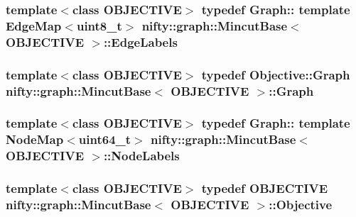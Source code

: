 \subsubsection[{Edge\+Labels}]{\setlength{\rightskip}{0pt plus 5cm}template$<$class O\+B\+J\+E\+C\+T\+I\+V\+E$>$ typedef Graph\+:: template Edge\+Map$<$uint8\+\_\+t$>$ {\bf nifty\+::graph\+::\+Mincut\+Base}$<$ O\+B\+J\+E\+C\+T\+I\+V\+E $>$\+::{\bf Edge\+Labels}}\label{classnifty_1_1graph_1_1MincutBase_a79320522726432c6f7e2f2b2c632683e}
\hypertarget{classnifty_1_1graph_1_1MincutBase_a777a4e1001d79f14dc4406d11320f6ff}{}
\subsubsection[{Graph}]{\setlength{\rightskip}{0pt plus 5cm}template$<$class O\+B\+J\+E\+C\+T\+I\+V\+E$>$ typedef Objective\+::\+Graph {\bf nifty\+::graph\+::\+Mincut\+Base}$<$ O\+B\+J\+E\+C\+T\+I\+V\+E $>$\+::{\bf Graph}}\label{classnifty_1_1graph_1_1MincutBase_a777a4e1001d79f14dc4406d11320f6ff}
\hypertarget{classnifty_1_1graph_1_1MincutBase_a9dc6555e37d38de23f194f87ca1497d5}{}
\subsubsection[{Node\+Labels}]{\setlength{\rightskip}{0pt plus 5cm}template$<$class O\+B\+J\+E\+C\+T\+I\+V\+E$>$ typedef Graph\+:: template Node\+Map$<$uint64\+\_\+t$>$ {\bf nifty\+::graph\+::\+Mincut\+Base}$<$ O\+B\+J\+E\+C\+T\+I\+V\+E $>$\+::{\bf Node\+Labels}}\label{classnifty_1_1graph_1_1MincutBase_a9dc6555e37d38de23f194f87ca1497d5}
\hypertarget{classnifty_1_1graph_1_1MincutBase_afac19d146202da5a1d3a4aa4b89ea1fc}{}
\subsubsection[{Objective}]{\setlength{\rightskip}{0pt plus 5cm}template$<$class O\+B\+J\+E\+C\+T\+I\+V\+E$>$ typedef O\+B\+J\+E\+C\+T\+I\+V\+E {\bf nifty\+::graph\+::\+Mincut\+Base}$<$ O\+B\+J\+E\+C\+T\+I\+V\+E $>$\+::{\bf Objective}}\label{classnifty_1_1graph_1_1MincutBase_afac19d146202da5a1d3a4aa4b89ea1fc}
\hypertarget{classnifty_1_1graph_1_1MincutBase_a5ba378dc5a1fc073eb9449ca635e7648}{}
